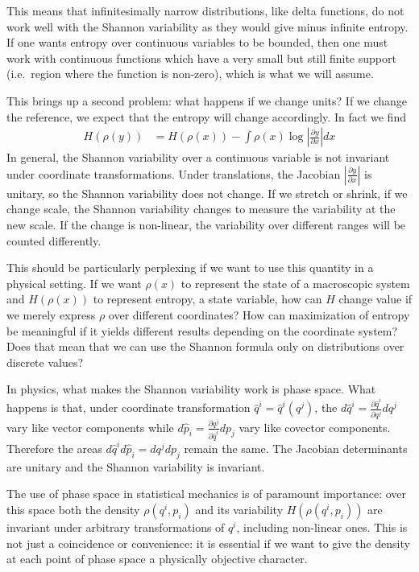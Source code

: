 \documentclass[iopart]{revtex4-1}
\begin{document}
This means that infinitesimally narrow distributions, like delta functions, do not work well with the Shannon variability as they would give minus infinite entropy. If one wants entropy over continuous variables to be bounded, then one must work with continuous functions which have a very small but still finite support (i.e.~region where the function is non-zero), which is what we will assume.

This brings up a second problem: what happens if we change units? If we change the reference, we expect that the entropy will change accordingly. In fact we find
\begin{equation}
\begin{aligned}
H(\rho(y)) &= H(\rho(x)) - \int \rho(x)  \log \left|\frac{\partial y}{\partial x}\right|  dx 
\end{aligned}
\end{equation}
In general, the Shannon variability over a continuous variable is not invariant under coordinate transformations. Under translations, the Jacobian $\left|\frac{\partial y}{\partial x}\right|$ is unitary, so the Shannon variability does not change. If we stretch or shrink, if we change scale, the Shannon variability changes to measure the variability at the new scale. If the change is non-linear, the variability over different ranges will be counted differently.

This should be particularly perplexing if we want to use this quantity in a physical setting. If we want $\rho(x)$ to represent the state of a macroscopic system and $H(\rho(x))$ to represent entropy, a state variable, how can $H$ change value if we merely express $\rho$ over different coordinates? How can maximization of entropy be meaningful if it yields different results depending on the coordinate system? Does that mean that we can use the Shannon formula only on distributions over discrete values?

In physics, what makes the Shannon variability work is phase space. What happens is that, under coordinate transformation $\hat{q}^i = \hat{q}^i(q^j)$, the $d\hat{q}^i = \frac{\partial \hat{q}^i}{\partial q^j } dq^j$ vary like vector components while $d\hat{p}_i = \frac{\partial q^j}{\partial \hat{q}^i } dp_j$ vary like covector components. Therefore the areas $d\hat{q}^i d\hat{p}_i = dq^j dp_j$ remain the same. The Jacobian determinants are unitary and the Shannon variability is invariant.

The use of phase space in statistical mechanics is of paramount importance: over this space both the density $\rho(q^i, p
_i)$ and its variability $H(\rho(q^i, p
_i))$ are invariant under arbitrary transformations of $q^i$, including non-linear ones. This is not just a coincidence or convenience: it is essential if we want to give the density at each point of phase space a physically objective character.
\end{document}
